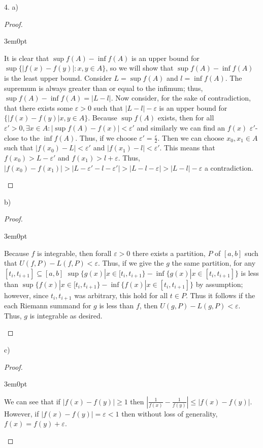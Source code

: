 \documentclass[11pt]{article}
\newenvironment{myproof}
{\begin{proof} \begin{adjustwidth}{3em}{0pt}$ $\par\nobreak\ignorespaces}
{\end{adjustwidth} \end{proof}}
\begin{document}
\begin{flushleft}
4. a)

\begin{myproof}
It is clear that $\sup f(A) - \inf f(A)$ is an upper bound for $\sup \{|f(x) - f(y)|:x,y \in A \}$, so we will show that $\sup f(A) - \inf f(A)$ is the least upper bound.
Consider $L = \sup f(A)$ and $l = \inf f(A)$. The supremum is always greater than or equal to the infimum; thus, $\sup f(A) - \inf f(A) = |L - l|$. Now consider, for the sake of contradiction, that there exists some $\varepsilon >0$ such that $|L-l|- \varepsilon$ is an upper bound for $\{|f(x) -f(y)| x,y \in A \}$. Because $\sup f(A)$ exists, then for all $\varepsilon' >0, \exists x \in A: |\sup f(A)-f(x)| < \varepsilon'$ and similarly we can find an $f(x)$ $\varepsilon'$-close to the $\inf f(A)$. Thus, if we choose $\varepsilon' = \frac{\varepsilon}{2}$. Then we can choose $x_0,x_1 \in A$ such that $|f(x_0) - L| < \varepsilon'$ and $|f(x_1) - l| < \varepsilon'$. This means that $f(x_0)> L-\varepsilon'$ and $f(x_1) > l + \varepsilon$. Thus, $|f(x_0) - f(x_1)| > |L - \varepsilon' -l - \varepsilon'| > |L - l - \varepsilon| > |L-l| - \varepsilon$ a contradiction.

\end{myproof}

b)

\begin{myproof}
Because $f$ is integrable, then forall $\varepsilon > 0$ there exists a partition, $P$ of $[a,b]$ such that $U(f,P) - L(f,P) < \varepsilon$. Thus, if we give the $g$ the same partition, for any $[t_i,t_{i+1}] \subseteq [a,b]$  $\sup \{g(x)|x \in [t_i,t_{i+1} \} - \inf \{g(x)|x \in [t_i,t_{i+1}] \}$ is less than  $\sup \{f(x)|x \in [t_i,t_{i+1} \} - \inf \{f(x)|x \in [t_i,t_{i+1}] \}$ by assumption; however, since $t_i,t_{i+1}$ was arbitrary, this hold for all $t \in P$. Thus it follows if the each Riemann summand for $g$ is less than $f$, then $U(g,P) - L(g,P) < \varepsilon$. Thus, $g$ is integrable as desired.
\end{myproof}

c)

\begin{myproof}
We can see that if $|f(x) - f(y)| \geq 1$ then $|\frac{1}{f(x)} - \frac{1}{f(y)}| \leq |f(x) - f(y)|$. However, if $|f(x) - f(y)| = \varepsilon < 1$ then without loss of generality, $f(x) = f(y) + \varepsilon$.
\end{myproof}

\end{flushleft}
\end{document}
